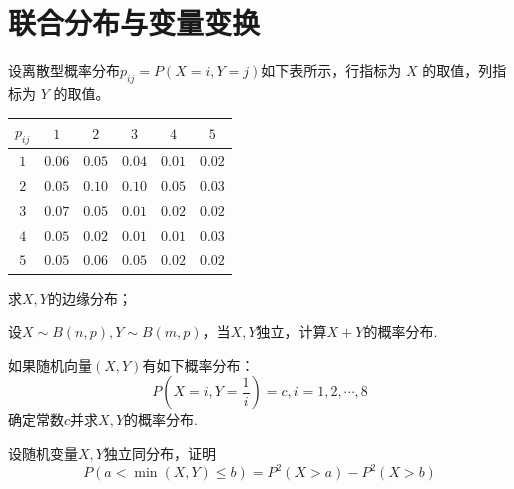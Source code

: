 \clearpage\section{联合分布与变量变换}

\begin{exercise}[联合概率表与边缘分布]\label{q:Y4.3}
设离散型概率分布$p_{ij}=P(X=i,Y=j)$如下表所示，行指标为 $X$ 的取值，列指标为 $Y$ 的取值。

\begin{center}
    
    \begin{tabular}{|c|c|c|c|c|c|} \hline 
 $p_{ij}$&  $1$&$2$&$3$&$4$&$5$\\ \hline 
 $1$&  $0.06$&$0.05$    &$0.04$&$0.01$&$0.02$\\ \hline 
         $2$&    $0.05$&$0.10$&$0.10$&$0.05$&$0.03$\\ \hline 
         $3$& 
      $0.07$&$0.05$& $0.01$&$0.02$&$0.02$\\ \hline
 $4$& $0.05$& $0.02$& $0.01$&$0.01$&$0.03$\\\hline
 $5$& $0.05$& $0.06$& $0.05$& $0.02$&$0.02$\\\hline\end{tabular}
\end{center}

求$X,Y$的边缘分布；\par{}\end{exercise}

\begin{exercise}[同参数二项变量之和]\label{q:Y4.6}
设$X\sim B(n,p),Y\sim B(m,p)$，当$X,Y$独立，计算$X+Y$的概率分布.\par{}\end{exercise}

\begin{exercise}[函数依赖的离散向量]\label{q:Y4.8}
如果随机向量$(X,Y)$有如下概率分布：
\[
P(X=i,Y=\frac{1}{i})=c,i=1,2,\cdots,8
\]
确定常数$c$并求$X,Y$的概率分布.\par{}\end{exercise}

\begin{exercise}[最小值的尾概率]\label{q:Y4.9}
设随机变量$X,Y$独立同分布，证明
\[
P(a<\min (X,Y)\leqslant b)=P^2(X>a)-P^2(X>b)
\]\par{}\end{exercise}

